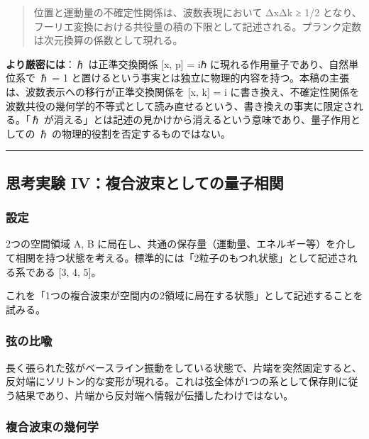 \documentclass[
  11pt,
]{ltjsarticle}
\begin{document}
\begin{quote}
位置と運動量の不確定性関係は、波数表現において ΔxΔk ≥ 1/2
となり、フーリエ変換における共役量の積の下限として記述される。プランク定数は次元換算の係数として現れる。
\end{quote}

\textbf{より厳密には}：ℏ は正準交換関係 {[}x, p{]} = iℏ
に現れる作用量子であり、自然単位系で ℏ = 1
と置けるという事実とは独立に物理的内容を持つ。本稿の主張は、波数表示への移行が正準交換関係を
{[}x, k{]} = i
に書き換え、不確定性関係を波数共役の幾何学的不等式として読み直せるという、書き換えの事実に限定される。「ℏ
が消える」とは記述の見かけから消えるという意味であり、量子作用としての ℏ
の物理的役割を否定するものではない。

\begin{center}\rule{0.5\linewidth}{0.5pt}\end{center}

\subsection{思考実験
IV：複合波束としての量子相関}\label{ux601dux8003ux5b9fux9a13-ivux8907ux5408ux6ce2ux675fux3068ux3057ux3066ux306eux91cfux5b50ux76f8ux95a2}

\subsubsection{設定}\label{ux8a2dux5b9a-3}

2つの空間領域 A, B
に局在し、共通の保存量（運動量、エネルギー等）を介して相関を持つ状態を考える。標準的には「2粒子のもつれ状態」として記述される系である
{[}3, 4, 5{]}。

これを「1つの複合波束が空間内の2領域に局在する状態」として記述することを試みる。

\subsubsection{弦の比喩}\label{ux5f26ux306eux6bd4ux55a9}

長く張られた弦がベースライン振動をしている状態で、片端を突然固定すると、反対端にソリトン的な変形が現れる。これは弦全体が1つの系として保存則に従う結果であり、片端から反対端へ情報が伝播したわけではない。

\subsubsection{複合波束の幾何学}\label{ux8907ux5408ux6ce2ux675fux306eux5e7eux4f55ux5b66}
\end{document}
